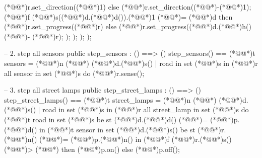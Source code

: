 \documentclass[a4paper]{article}
\begin{document}
\begin{vdm_al}
                                                    (*@@*)r.set_direction((*@\vdmnotcovered{}@*)1)
                                                else
                                                    (*@@*)r.set_direction((*@\vdmnotcovered{}@*)-(*@\vdmnotcovered{}@*)1);
                                                (*@@*)f (*@@*)s((*@@*)d.(*@@*)d()).(*@@*)1 (*@\vdmnotcovered{}@*)= (*@@*)d then
                                                    (*@@*)r.set_progress((*@@*)r)
                                                else
                                                    (*@@*)r.set_progress((*@@*)d.(*@@*)h() (*@\vdmnotcovered{}@*)- (*@@*)r);
                                            );
                                    );
                    );
            );

    -- 2. step all sensors
    public step_sensors : () ==> ()
    step_sensors() ==
        (*@@*)t sensors = (*@@*)n (*@\vdmnotcovered{}@*){
            (*@@*)d.(*@@*)s()
            | road in set (*@@*)s
        } in
            (*@@*)r all sensor in set (*@@*)s do
                (*@@*)r.sense();

    -- 3. step all street lamps
    public step_street_lamps : () ==> ()
    step_street_lamps() ==
        (*@@*)t street_lamps = (*@@*)n (*@\vdmnotcovered{}@*){
            (*@@*)d.(*@@*)s()
            | road in set (*@@*)s
        } in
            (*@@*)r all street_lamp in set (*@@*)s do
                (*@@*)t road in set (*@@*)s be st (*@@*)d.(*@@*)d() (*@\vdmnotcovered{}@*)= (*@@*)p.(*@@*)d() in
                    (*@@*)t sensor in set (*@@*)d.(*@@*)s() be st (*@@*)r.(*@@*)n() (*@\vdmnotcovered{}@*)= (*@@*)p.(*@@*)n() in
                        (*@@*)f (*@@*)r.(*@@*)s() (*@\vdmnotcovered{<}@*)> (*@\vdmnotcovered{}@*){} then
                            (*@@*)p.on()
                        else
                            (*@@*)p.off();


\end{vdm_al}
\end{document}
